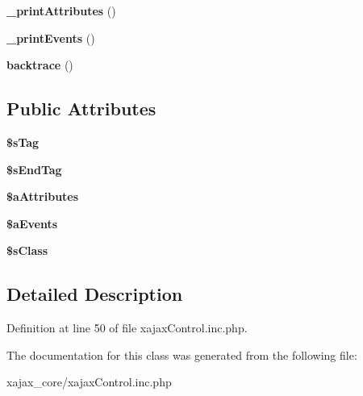 \begin{DoxyCompactItemize}
\item 
\hypertarget{classxajaxControl_a415d1d0bc9e6a2ce6509757efe9a1ac8}{
{\bfseries \_\-printAttributes} ()}
\label{classxajaxControl_a415d1d0bc9e6a2ce6509757efe9a1ac8}

\item 
\hypertarget{classxajaxControl_af5f8aeff7a7946c8d13c0108f6ae9405}{
{\bfseries \_\-printEvents} ()}
\label{classxajaxControl_af5f8aeff7a7946c8d13c0108f6ae9405}

\item 
\hypertarget{classxajaxControl_a8d00e607279a560efc5c213e562196fe}{
{\bfseries backtrace} ()}
\label{classxajaxControl_a8d00e607279a560efc5c213e562196fe}

\end{DoxyCompactItemize}
\subsection*{Public Attributes}
\begin{DoxyCompactItemize}
\item 
\hypertarget{classxajaxControl_ad78b92953a7951c23f9f113cc0db602a}{
{\bfseries \$sTag}}
\label{classxajaxControl_ad78b92953a7951c23f9f113cc0db602a}

\item 
\hypertarget{classxajaxControl_a67abb5d671979573f87e5e1f2eabb3eb}{
{\bfseries \$sEndTag}}
\label{classxajaxControl_a67abb5d671979573f87e5e1f2eabb3eb}

\item 
\hypertarget{classxajaxControl_a36e6ab04933ec4b75e7a429bec3ec04a}{
{\bfseries \$aAttributes}}
\label{classxajaxControl_a36e6ab04933ec4b75e7a429bec3ec04a}

\item 
\hypertarget{classxajaxControl_a065c812c4cf5eb17f646e2d147b5992b}{
{\bfseries \$aEvents}}
\label{classxajaxControl_a065c812c4cf5eb17f646e2d147b5992b}

\item 
\hypertarget{classxajaxControl_aeab64e17477449e59157599335a0d1f2}{
{\bfseries \$sClass}}
\label{classxajaxControl_aeab64e17477449e59157599335a0d1f2}

\end{DoxyCompactItemize}


\subsection{Detailed Description}


Definition at line 50 of file xajaxControl.inc.php.



The documentation for this class was generated from the following file:\begin{DoxyCompactItemize}
\item 
xajax\_\-core/xajaxControl.inc.php\end{DoxyCompactItemize}
